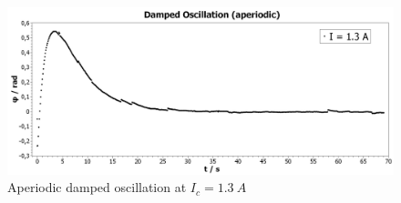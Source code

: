             \begin{figure}
                \centering
                \includegraphics[width=1\linewidth]{"messdaten/Damped Oscillation (aperiodic)"}
                \caption[Aperiodic damped oscillation at $ I_c=\SI{1.3}{A} $]{Aperiodic damped oscillation at $ I_c=\SI{1.3}{A} $}
                \label{fig:damped-oscillation-aperiodic}
            \end{figure}
